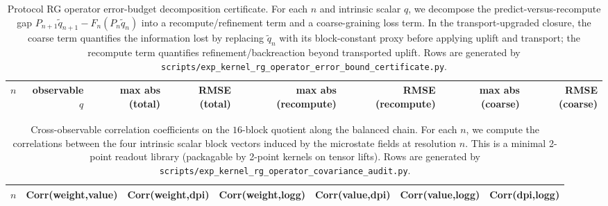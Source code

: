 \begin{table}[H]
\centering
\scriptsize
\setlength{\tabcolsep}{6pt}
\renewcommand{\arraystretch}{1.15}
\begin{tabular}{rr r r r r r r}
\toprule
$n$ & observable $q$ & max abs (total) & RMSE (total) & max abs (recompute) & RMSE (recompute) & max abs (coarse) & RMSE (coarse) \\
\midrule
%
\end{tabular}
\caption{Protocol RG operator error-budget decomposition certificate.
For each $n$ and intrinsic scalar $q$, we decompose the predict-versus-recompute gap
$P_{n+1}\tilde q_{n+1}-F_n(P_n\tilde q_n)$ into a recompute/refinement term and a coarse-graining loss term.
In the transport-upgraded closure, the coarse term quantifies the information lost by replacing $\tilde q_n$ with its block-constant proxy before applying uplift and transport; the recompute term quantifies refinement/backreaction beyond transported uplift.
Rows are generated by \texttt{scripts/exp\_kernel\_rg\_operator\_error\_bound\_certificate.py}.}
\label{tab:kernel_rg_operator_error_budget}
\end{table}

\begin{table}[H]
\centering
\scriptsize
\setlength{\tabcolsep}{6pt}
\renewcommand{\arraystretch}{1.15}
\begin{tabular}{rrrrrrr}
\toprule
$n$ & Corr(weight,value) & Corr(weight,dpi) & Corr(weight,logg) & Corr(value,dpi) & Corr(value,logg) & Corr(dpi,logg) \\
\midrule
%
\end{tabular}
\caption{Cross-observable correlation coefficients on the $16$-block quotient along the balanced chain.
For each $n$, we compute the correlations between the four intrinsic scalar block vectors induced by the microstate fields at resolution $n$.
This is a minimal 2-point readout library (packagable by 2-point kernels on tensor lifts).
Rows are generated by \texttt{scripts/exp\_kernel\_rg\_operator\_covariance\_audit.py}.}
\label{tab:kernel_rg_operator_covariance}
\end{table}

